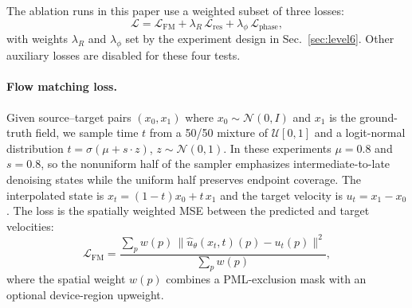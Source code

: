 \documentclass[%
 reprint,
 amsmath,amssymb,
 aps,
floatfix,
]{revtex4-2}
\begin{document}
The ablation runs in this paper use a weighted subset of three losses:
\begin{equation}
    \mathcal{L} = \mathcal{L}_\text{FM}
    + \lambda_R\,\mathcal{L}_\text{res}
    + \lambda_\phi\,\mathcal{L}_\text{phase},
    \label{eq:total_loss}
\end{equation}
with weights $\lambda_R$ and $\lambda_\phi$ set by the experiment design in Sec.~\ref{sec:level6}. Other auxiliary losses are disabled for these four tests.

\paragraph{Flow matching loss.}
Given source--target pairs $(x_0, x_1)$ where $x_0 \sim \mathcal{N}(0,I)$ and $x_1$ is the ground-truth field, we sample time $t$ from a 50/50 mixture of $\mathcal{U}[0,1]$ and a logit-normal distribution $t = \sigma(\mu + s\cdot z)$, $z \sim \mathcal{N}(0,1)$. In these experiments $\mu=0.8$ and $s=0.8$, so the nonuniform half of the sampler emphasizes intermediate-to-late denoising states while the uniform half preserves endpoint coverage. The interpolated state is $x_t = (1-t)x_0 + t\,x_1$ and the target velocity is $u_t = x_1 - x_0$. The loss is the spatially weighted MSE between the predicted and target velocities:
\begin{equation}
    \mathcal{L}_\text{FM} = \frac{\sum_{p} w(p)\,\|\hat{u}_\theta(x_t,t)(p) - u_t(p)\|^2}{\sum_{p} w(p)},
    \label{eq:fm_loss_weighted}
\end{equation}
where the spatial weight $w(p)$ combines a PML-exclusion mask with an optional device-region upweight.
\end{document}
